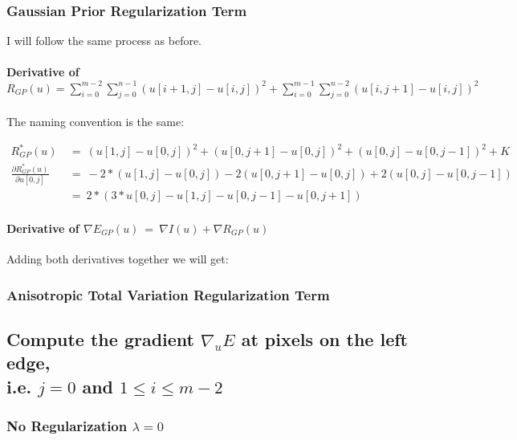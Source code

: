 \documentclass{report}
\begin{document}
			\subsubsection{Gaussian Prior Regularization Term}
			\startsubsection
				I will follow the same process as before.
				\vspace{-0.4cm} \paragraph{Derivative of $R_{GP}(u) = \sum_{i=0}^{m-2} \sum_{j=0}^{n-1} ( u[i+1,j] - u[i,j] )^2 + \sum_{i=0}^{m-1} \sum_{j=0}^{n-2} ( u[i,j+1] - u[i,j] )^2$}
				\startsubsection
					\vspace{0.2cm} The naming convention is the same:
				\closesection
				\begin{adjustwidth}{-4em}{}
					\vspace{-0.5cm}
					\begin{align*}
						R_{GP}^*(u) \ & = \ (u[1,j] - u[0,j])^2 + (u[0,j+1] - u[0,j])^2 + (u[0,j] - u[0,j-1])^2 + K \\
						\frac{\partial R_{GP}^*(u)}{\partial u[0,j]} \ & = \ -2 * (u[1,j] - u[0,j]) - 2 (u[0,j+1] - u[0,j]) + 2 (u[0,j] - u[0,j-1]) \\
						& = \ 2 * (3 * u[0,j] - u[1,j] - u[0,j-1] - u[0,j+1])
					\end{align*}
				\end{adjustwidth}
				\vspace{-0.4cm} \paragraph{Derivative of $\nabla E_{GP}(u) \ = \ \nabla I(u) + \nabla R_{GP}(u)$}
				\startsubsection
					Adding both derivatives together we will get:
				\closesection
			\closesection
			\subsubsection{Anisotropic Total Variation Regularization Term}
			\startsubsection
			\closesection
		\closesection
		\subsection{Compute the gradient $\nabla_u E$ at pixels on the left edge, \\ i.e. $j = 0$ and $1 \leq i \leq m-2$}
		\startsubsection
			\subsubsection{No Regularization $\lambda = 0$}
			\startsubsection
			\closesection
\end{document}
